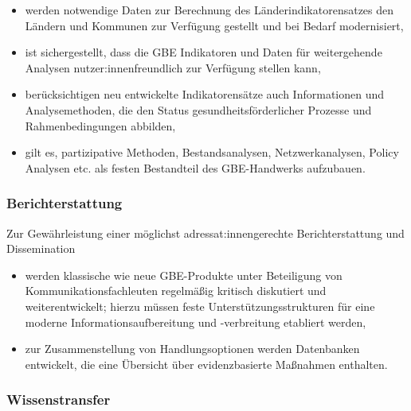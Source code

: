 \documentclass{article}
\begin{document}
\begin{itemize}
\item werden notwendige Daten zur Berechnung des Länderindikatorensatzes den Ländern und Kommunen zur Verfügung gestellt und bei Bedarf modernisiert,


\item ist sichergestellt, dass die GBE Indikatoren und Daten für weitergehende Analysen nutzer:innenfreundlich zur Verfügung stellen kann,


\item berücksichtigen neu entwickelte Indikatorensätze auch Informationen und Analysemethoden, die den Status gesundheitsförderlicher Prozesse und Rahmenbedingungen abbilden,


\item gilt es, partizipative Methoden, Bestandsanalysen, Netzwerkanalysen, Policy Analysen etc. als festen Bestandteil des GBE-Handwerks aufzubauen.


\end{itemize}

\subsubsection{Berichterstattung}\label{H8121813}



Zur Gewährleistung einer möglichst adressat:innengerechte Berichterstattung und Dissemination

\begin{itemize}
\item werden klassische wie neue GBE-Produkte unter Beteiligung von Kommunikationsfachleuten regelmäßig kritisch diskutiert und weiterentwickelt; hierzu müssen feste Unterstützungsstrukturen für eine moderne Informationsaufbereitung und -verbreitung etabliert werden,


\item zur Zusammenstellung von Handlungsoptionen werden Datenbanken entwickelt, die eine Übersicht über evidenzbasierte Maßnahmen enthalten.


\end{itemize}

\subsubsection{Wissenstransfer}\label{H1588953}
\end{document}

